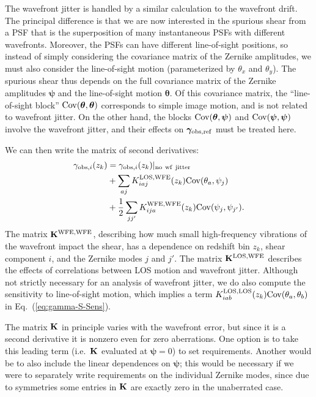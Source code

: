 \documentclass[aps,prd, amsmath,amssymb,superscriptaddress,showkeys,nofootinbib,reprint,preprintnumbers]{revtex4-1}
\begin{document}
The wavefront jitter is handled by a similar calculation to the
wavefront drift. The principal difference is that we are now
interested in the spurious shear from a PSF that is the superposition
of many instantaneous PSFs with different wavefronts. Moreover, the
PSFs can have different line-of-sight positions, so instead of simply
considering the covariance matrix of the Zernike amplitudes, we must
also consider the line-of-sight motion (parameterized by $\theta_x$
and $\theta_y$). The spurious shear thus depends on the full
covariance matrix of the Zernike amplitudes ${\boldsymbol\psi}$ and
the line-of-sight motion ${\boldsymbol\theta}$. Of this covariance
matrix, the ``line-of-sight block'' ${\rm
Cov}({\boldsymbol\theta},{\boldsymbol\theta})$ corresponds to simple
image motion, and is not related to wavefront jitter. On the other
hand, the blocks ${\rm Cov}({\boldsymbol\theta},{\boldsymbol\psi})$
and ${\rm Cov}({\boldsymbol\psi},{\boldsymbol\psi})$ involve the
wavefront jitter, and their effects on ${\boldsymbol\gamma}_{\rm
obs,ref}$ must be treated here.

We can then write the matrix of second derivatives:
\begin{align}
\gamma_{{\rm obs},i}(z_k) &= \gamma_{{\rm obs},i}(z_k)|_{\rm no~wf~jitter}\nonumber\\
&+ \sum_{aj} K^{\rm LOS,WFE}_{iaj}(z_k) {\rm Cov}({\theta}_a,{\psi}_j)\nonumber\\
&+ \frac12 \sum_{jj'} K^{\rm WFE,WFE}_{ija}(z_k) {\rm Cov}({\psi}_j,{\psi}_{j'}).
\label{eq:gamma-S-Sens}
\end{align}
The matrix ${\bf K}^{\rm WFE,WFE}$, describing how much small
high-frequency vibrations of the wavefront impact the shear, has a
dependence on redshift bin $z_k$, shear component $i$, and the Zernike
modes $j$ and $j'$. The matrix ${\bf K}^{\rm LOS,WFE}$ describes the
effects of correlations between LOS motion and wavefront jitter.
Although not strictly necessary for an analysis of wavefront jitter, we do also compute the sensitivity to line-of-sight motion, which implies a term $K^{\rm LOS,LOS}_{iab}(z_k) {\rm Cov}({\theta}_a,{\theta}_b)$ in Eq.~(\ref{eq:gamma-S-Sens}).

The matrix ${\bf K}$ in principle varies with the wavefront error, but
since it is a second derivative it is nonzero even for zero
aberrations. One option is to take this leading term (i.e.\ ${\bf K}$
evaluated at ${\boldsymbol\psi}=0$) to set requirements. Another would
be to also include the linear dependences on ${\boldsymbol\psi}$; this
would be necessary if we were to separately write requirements on the
individual Zernike modes, since due to symmetries some entries in
${\bf K}$ are exactly zero in the unaberrated case.
\end{document}

